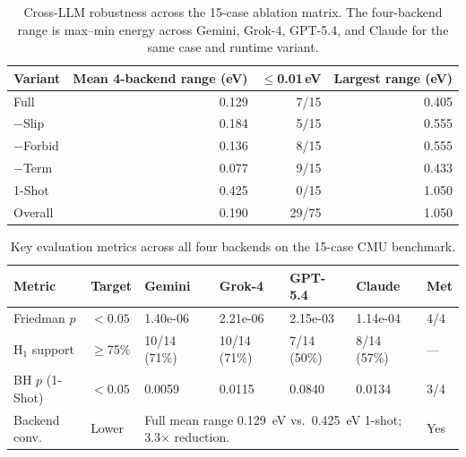 \begin{table}[t]
\centering
\caption{Cross-LLM robustness across the 15-case ablation matrix. The four-backend range is max--min energy across Gemini, Grok-4, GPT-5.4, and Claude for the same case and runtime variant.}
\label{tab:cross-llm-summary}
\begin{tabular}{lrrr}
\toprule
Variant & Mean 4-backend range (eV) & $\leq$0.01\,eV & Largest range (eV) \\
\midrule
Full & 0.129 & 7/15 & 0.405 \\
$-$Slip & 0.184 & 5/15 & 0.555 \\
$-$Forbid & 0.136 & 8/15 & 0.555 \\
$-$Term & 0.077 & 9/15 & 0.433 \\
1-Shot & 0.425 & 0/15 & 1.050 \\
\midrule
Overall & 0.190 & 29/75 & 1.050 \\
\bottomrule
\end{tabular}
\end{table}

\begin{table}[t]
\centering
\caption{Key evaluation metrics across all four backends on the 15-case CMU benchmark.}
\label{tab:key-evaluation-metrics}
\begin{tabular}{p{2.8cm}p{1.3cm}p{1.8cm}p{1.8cm}p{1.8cm}p{1.8cm}p{1.0cm}}
\toprule
Metric & Target & Gemini & Grok-4 & GPT-5.4 & Claude & Met \\
\midrule
Friedman $p$ & $< 0.05$ & 1.40e-06 & 2.21e-06 & 2.15e-03 & 1.14e-04 & 4/4 \\
H$_1$ support & $\geq$75\% & 10/14 (71\%) & 10/14 (71\%) & 7/14 (50\%) & 8/14 (57\%) & --- \\
BH $p$ (1-Shot) & $< 0.05$ & 0.0059 & 0.0115 & 0.0840 & 0.0134 & 3/4 \\
Backend conv. & Lower & \multicolumn{4}{p{7.2cm}}{Full mean range 0.129~eV vs.\ 0.425~eV 1-shot; 3.3$\times$ reduction.} & Yes \\
\bottomrule
\end{tabular}
\end{table}


